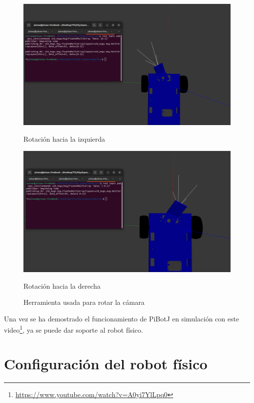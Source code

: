 \begin{figure}[ht!]
	\centering
	\begin{minipage}{0.45\linewidth}
		\centering
		\includegraphics[width=\linewidth]{figs/cap6/rotizq.png}
		\caption*{\centering Rotación hacia la izquierda} 
	\end{minipage}
	\hspace{0.25cm}
	\begin{minipage}{0.45\linewidth}
		\centering
		\includegraphics[width=\linewidth]{figs/cap6/rotder.png}
		\caption*{\centering Rotación hacia la derecha} 
	\end{minipage}
	\caption{Herramienta usada para rotar la cámara}
	\label{fig:camararot}
\end{figure}


Una vez se ha demostrado el funcionamiento de PiBotJ en simulación con este video\footnote{\url{https://www.youtube.com/watch?v=A0yi7YlLpq0}}, ya se puede dar soporte al robot físico.

\section{Configuración del robot físico}
\label{sec:configrf}

